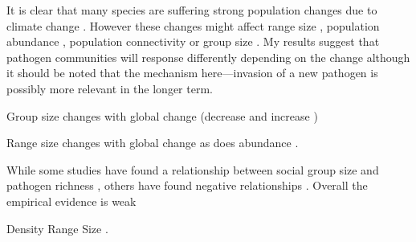 
It is clear that many species are suffering strong population changes due to climate change \cite{thomas2004extinction}.
However these changes might affect range size \cite{thomas2004extinction}, population abundance \cite{craigie2010large}, population connectivity \cite{} or group size \cite{lehmann2010apes, zunino2007habitat, manor2003impact, atwood2006influence}.
My results suggest that pathogen communities will response differently depending on the change although it should be noted that the mechanism here---invasion of a new pathogen    is possibly more relevant in the longer term.


Group size changes with global change (decrease \cite{lehmann2010apes, zunino2007habitat, manor2003impact, atwood2006influence} and increase \cite{lehmann2010apes})


Range size changes with global change \cite{thomas2004extinction} as does abundance \cite{craigie2010large}.






While some studies have found a relationship between social group size and pathogen richness \cite{vitone2004body}, others have found negative relationships \cite{gay2014parasite}.
Overall the empirical evidence is weak \cite{ezenwa2006host, rifkin2012animals}


Density \cite{morand1998density, kamiya2014determines, lindenfors2007parasite, nunn2003comparative, arneberg2002host}
Range Size \cite{lindenfors2007parasite, nunn2003comparative, turmelle2009correlates, huang2015parasite, kamiya2014determines}.











